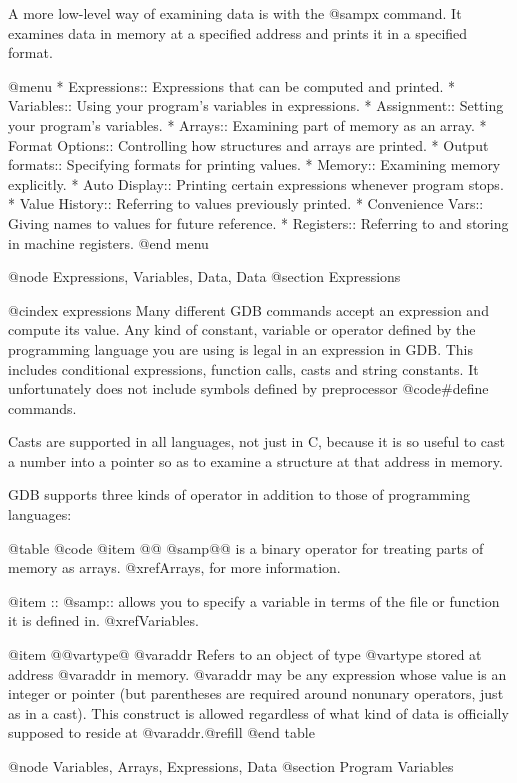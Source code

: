 A more low-level way of examining data is with the @samp{x} command.
It examines data in memory at a specified address and prints it in a
specified format.

@menu
* Expressions::      Expressions that can be computed and printed.
* Variables::        Using your program's variables in expressions.
* Assignment::       Setting your program's variables.
* Arrays::           Examining part of memory as an array.
* Format Options::   Controlling how structures and arrays are printed.
* Output formats::   Specifying formats for printing values.
* Memory::           Examining memory explicitly.
* Auto Display::     Printing certain expressions whenever program stops.
* Value History::    Referring to values previously printed.
* Convenience Vars:: Giving names to values for future reference.
* Registers::        Referring to and storing in machine registers.
@end menu

@node Expressions, Variables, Data, Data
@section Expressions

@cindex expressions
Many different GDB commands accept an expression and compute its value.
Any kind of constant, variable or operator defined by the programming
language you are using is legal in an expression in GDB.  This includes
conditional expressions, function calls, casts and string constants.
It unfortunately does not include symbols defined by preprocessor
@code{#define} commands.

Casts are supported in all languages, not just in C, because it is so
useful to cast a number into a pointer so as to examine a structure
at that address in memory.

GDB supports three kinds of operator in addition to those of programming
languages:

@table @code
@item @@
@samp{@@} is a binary operator for treating parts of memory as arrays.
@xref{Arrays}, for more information.

@item ::
@samp{::} allows you to specify a variable in terms of the file or
function it is defined in.  @xref{Variables}.

@item @{@var{type}@} @var{addr}
Refers to an object of type @var{type} stored at address @var{addr} in
memory.  @var{addr} may be any expression whose value is an integer or
pointer (but parentheses are required around nonunary operators, just as in
a cast).  This construct is allowed regardless of what kind of data is
officially supposed to reside at @var{addr}.@refill
@end table

@node Variables, Arrays, Expressions, Data
@section Program Variables

